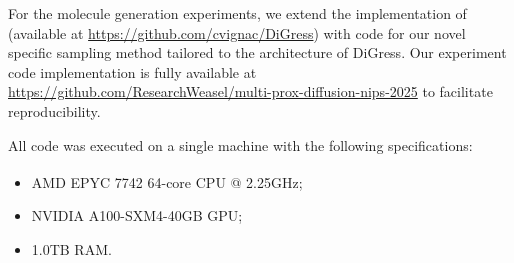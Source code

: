 For the molecule generation experiments, we extend the implementation of \cite{vignac_digress_2022} (available at \url{https://github.com/cvignac/DiGress}) with code for our novel specific sampling method tailored to the architecture of DiGress. Our experiment code implementation is fully available at \url{https://github.com/ResearchWeasel/multi-prox-diffusion-nips-2025} to facilitate reproducibility.

All code was executed on a single machine with the following specifications:
\begin{itemize}
    \item AMD EPYC\textsuperscript{\texttrademark} 7742 64-core CPU @ 2.25GHz;
    \item NVIDIA A100-SXM4-40GB GPU;
    \item 1.0TB RAM. 
\end{itemize}